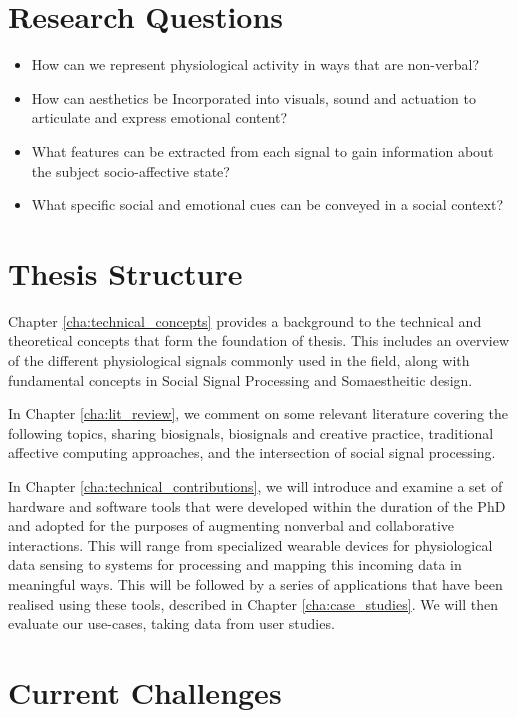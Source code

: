 \section{Research Questions}
\label{sec:research_questions}

\begin{itemize}
  \item How can we represent physiological activity in ways that are non-verbal?
  \item How can aesthetics be Incorporated into visuals, sound and actuation to articulate and express emotional content?
  \item What features can be extracted from each signal to gain information about the subject socio-affective state?
  \item What specific social and emotional cues can be conveyed in a social context?
\end{itemize}

\section{Thesis Structure} %
\label{sec:structure}

Chapter \ref{cha:technical_concepts} provides a background to the technical and theoretical concepts that form the foundation of thesis. This includes an overview of the different physiological signals commonly used in the field, along with fundamental concepts in Social Signal Processing and Somaestheitic design. 

In Chapter \ref{cha:lit_review}, we comment on some relevant literature covering the following topics, sharing biosignals, biosignals and creative practice, traditional affective computing approaches, and the intersection of social signal processing.

In Chapter \ref{cha:technical_contributions}, we will introduce and examine a set of hardware and software tools that were developed within the duration of the PhD and adopted for the purposes of augmenting nonverbal and collaborative interactions. This will range from specialized wearable devices for physiological data sensing to systems for processing and mapping this incoming data in meaningful ways. This will be followed by a series of applications that have been realised using these tools, described in Chapter \ref{cha:case_studies}. We will then evaluate our use-cases, taking data from user studies.  

\section{Current Challenges}
\label{sec:challenges}

